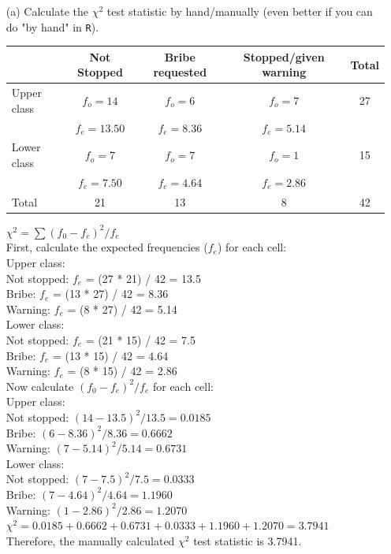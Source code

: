 \documentclass[12pt,letterpaper]{article}
\begin{document}
\begin{enumerate}
	
	\item [(a)]
	Calculate the $\chi^2$ test statistic by hand/manually (even better if you can do "by hand" in \texttt{R}).\\
	
	\begin{tabular}{|l|c|c|c|c|}
		\hline
		& Not Stopped & Bribe requested & Stopped/given warning & Total \\
		\hline
		Upper class & $f_o=14$ & $f_o=6$ & $f_o=7$ & 27 \\
		& $f_e = 13.50$ & $f_e = 8.36$ & $f_e = 5.14$ & \\
		\hline
		Lower class & $f_o=7$ & $f_o=7$ & $f_o=1$ & 15 \\
		& $f_e = 7.50$ & $f_e = 4.64$ & $f_e = 2.86$ & \\
		\hline
		Total & 21 & 13 & 8 & 42 \\
		\hline
	\end{tabular}
	
$\chi^2 = \sum(f_0 - f_e)^2 / f_e$\\
First, calculate the expected frequencies ($f_e$) for each cell:\\
Upper class:\\
Not stopped: $f_e$ = (27 * 21) / 42 = 13.5\\
Bribe: $f_e$ = (13 * 27) / 42 = 8.36\\
Warning: $f_e$ = (8 * 27) / 42 = 5.14\\
Lower class:\\
Not stopped: $f_e$ = (21 * 15) / 42 = 7.5\\
Bribe: $f_e$ = (13 * 15) / 42 = 4.64\\
Warning: $f_e$ = (8 * 15) / 42 = 2.86\\
Now calculate $(f_0 - f_e)^2 / f_e$ for each cell:\\
Upper class:\\
Not stopped:  $(14 - 13.5)^2 / 13.5 = 0.0185$\\
Bribe: $(6 - 8.36)^2 / 8.36 = 0.6662$\\
Warning: $(7 - 5.14)^2 / 5.14 = 0.6731$\\
Lower class:\\
Not stopped: $(7 - 7.5)^2 / 7.5 = 0.0333$\\
Bribe: $(7 - 4.64)^2 / 4.64 = 1.1960$\\
Warning: $(1 - 2.86)^2 / 2.86 = 1.2070$\\
$\chi^2 = 0.0185 + 0.6662 + 0.6731 + 0.0333 + 1.1960 + 1.2070 = 3.7941$\\
Therefore, the manually calculated $\chi^2$ test statistic is 3.7941.
	

\end{enumerate}
\end{document}
